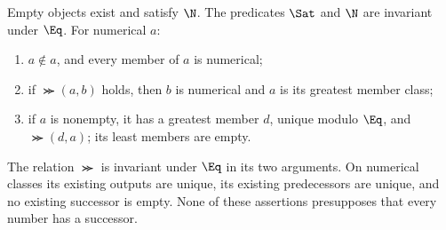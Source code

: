 \begin{lemma}\label{un:local}
Empty objects exist and satisfy $\N$. The predicates $\Sat$ and $\N$
are invariant under $\Eq$. For numerical $a$:
\begin{enumerate}
\item $a\notin a$, and every member of $a$ is numerical;
\item if $\Succ(a,b)$ holds, then $b$ is numerical and $a$ is its
      greatest member class;
\item if $a$ is nonempty, it has a greatest member $d$, unique modulo
      $\Eq$, and $\Succ(d,a)$; its least members are empty.
\end{enumerate}
The relation $\Succ$ is invariant under $\Eq$ in its two arguments.
On numerical classes its existing outputs are unique, its existing
predecessors are unique, and no existing successor is empty.
None of these assertions presupposes that every number has a successor.
\end{lemma}
